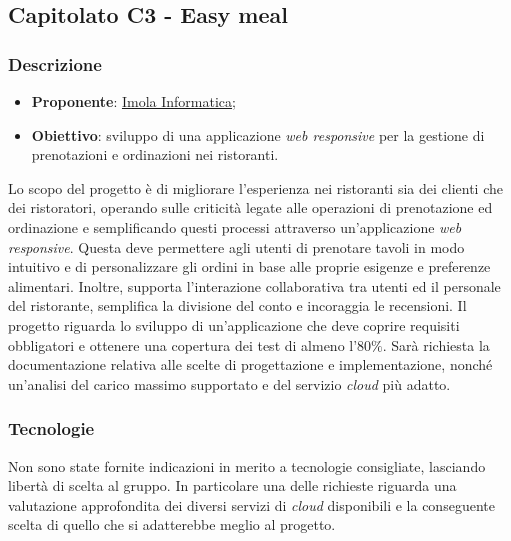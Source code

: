\subsection{Capitolato C3 - Easy meal}


\subsubsection{Descrizione}
\begin{itemize}
    \item \textbf{Proponente}: \href{https://imolainformatica.it/}{Imola Informatica};
    \item \textbf{Obiettivo}: sviluppo di una applicazione \textit{web responsive} per la gestione di prenotazioni e ordinazioni nei ristoranti.
\end{itemize}
Lo scopo del progetto è di migliorare l'esperienza nei ristoranti sia dei clienti che dei ristoratori, operando sulle criticità legate alle operazioni di prenotazione ed ordinazione e semplificando questi processi attraverso un'applicazione \textit{web responsive}. 
Questa deve permettere agli utenti di prenotare tavoli in modo intuitivo e di personalizzare gli ordini in base alle proprie esigenze e preferenze alimentari. 
Inoltre, supporta l'interazione collaborativa tra utenti ed il personale del ristorante, semplifica la divisione del conto e incoraggia le recensioni. 
Il progetto riguarda lo sviluppo di un'applicazione che deve coprire requisiti obbligatori e ottenere una copertura dei test di almeno l'$80\%$. 
Sarà richiesta la documentazione relativa alle scelte di progettazione e implementazione, nonché un'analisi del carico massimo supportato e del servizio \textit{cloud} più adatto.

\subsubsection{Tecnologie}
Non sono state fornite indicazioni in merito a tecnologie consigliate, lasciando libertà di scelta al gruppo. 
In particolare una delle richieste riguarda una valutazione approfondita dei diversi servizi di \textit{cloud} disponibili e la conseguente scelta di quello che si adatterebbe meglio al progetto.


